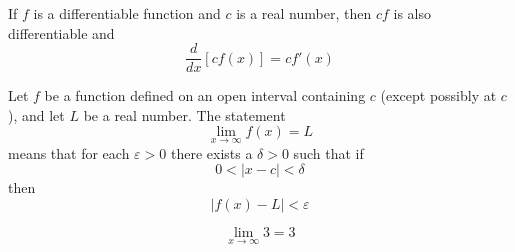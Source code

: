 





\begin{theorembox}[Theorem 2.4]
If $f$ is a differentiable function and $c$ is a real number, then $cf$ is also differentiable and
$$
\frac{d}{dx}\left[ cf(x) \right] = cf'(x)
$$
\end{theorembox}

\bigskip

\begin{definitionbox}
Let $f$ be a function defined on an open interval containing $c$ (except possibly at $c$), and let $L$ be a real number. The statement
$$
\lim_{x\to\infty} f(x) = L
$$
means that for each $\varepsilon > 0$ there exists a $\delta > 0$ such that if
$$
0 < \left| x-c \right| < \delta
$$
then
$$
\left| f(x) - L \right| < \varepsilon
$$
\end{definitionbox}

\bigskip


\begin{examplebox}
$$
\lim_{x\to\infty} 3 = 3
$$
\end{examplebox}


